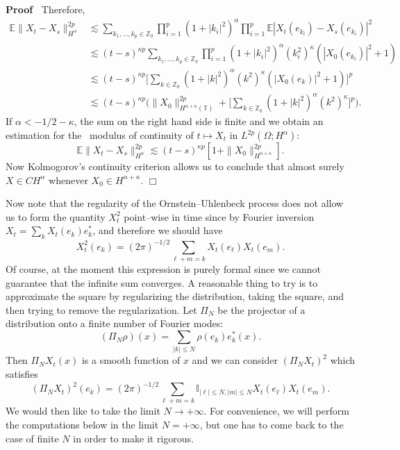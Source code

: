 \documentclass[a4paper,11pt]{article}
\newenvironment{proof}{\noindent\textbf{Proof\ }}{\hspace*{\fill}$\Box$\medskip}
\begin{document}
\begin{proof}
  Therefore,
  \begin{align*}
     \mathbb{E} \| X_t - X_s \|_{H^{\alpha}}^{2 p} & \lesssim \sum_{k_1, \ldots, k_p \in \mathbb{Z}_0} \prod_{i = 1}^p (1 + | k_i |^2)^{\alpha} \prod_{i = 1}^p \mathbb{E} | X_t (e_{k_i}) - X_s (e_{k_i}) |^2 \\
     & \lesssim (t - s)^{\kappa p} \sum_{k_1, \ldots, k_p \in \mathbb{Z}_0}  \prod_{i = 1}^p (1 + | k_i |^2)^{\alpha} (k_i^2)^{\kappa} (| X_0 (e_{k_i}) |^2 + 1) \\
     & \lesssim (t - s)^{\kappa p} \Big[ \sum_{k \in \mathbb{Z}_0} (1 + | k
     |^2)^{\alpha} (k^2)^{\kappa} (| X_0 (e_k) |^2 + 1) \Big]^p \\
     & \lesssim (t - s)^{\kappa p} \Big(\| X_0 \|^{2 p}_{H^{\alpha + \kappa} (\mathbb{T})} + \Big[\sum_{k \in \mathbb{Z}_0} (1 + | k |^2)^{\alpha} (k^2)^{\kappa}\Big]^p\Big) .
  \end{align*}
  If $\alpha < - 1 / 2 - \kappa$, the sum on the right hand side is finite and
  we obtain an estimation for the \ modulus of continuity of $t \mapsto X_t$
  in $L^{2 p} (\Omega ; H^{\alpha})$:
  \[ \mathbb{E} \| X_t - X_s \|_{H^{\alpha}}^{2 p} \lesssim (t - s)^{\kappa
     p} [1 + \| X_0 \|^{2 p}_{H^{\alpha + \kappa}}] . \]
  Now Kolmogorov's continuity criterion allows us to conclude that almost
  surely $X \in C H^{\alpha}$ whenever $X_0 \in H^{\alpha + \kappa}$.
\end{proof}

Now note that the regularity of the Ornstein--Uhlenbeck process does not allow
us to form the quantity $X^2_t$ point--wise in time since by Fourier inversion
$X_t = \sum_k X_t (e_k) e_k^{\ast}$, and therefore we should have
\[ X_t^2 (e_k) = (2 \pi)^{- 1 / 2} \sum_{\ell + m = k} X_t (e_{\ell}) X_t
   (e_m) . \]
Of course, at the moment this expression is purely formal since we cannot
guarantee that the infinite sum converges. A reasonable thing to try is to
approximate the square by regularizing the distribution, taking the square,
and then trying to remove the regularization. Let $\Pi_N$ be the projector of
a distribution onto a finite number of Fourier modes:
\[ (\Pi_N \rho) (x) = \sum_{| k | \leqslant N} \rho (e_k) e^{\ast}_k (x) . \]
Then $\Pi_N X_t (x)$ is a smooth function of $x$ and we can consider $(\Pi_N
X_t)^2$ which satisfies
\[ (\Pi_N X_t)^2 (e_k) = (2 \pi)^{- 1 / 2} \sum_{\ell + m = k} \mathbb{I}_{|
   \ell | \leqslant N, | m | \leqslant N} X_t (e_{\ell}) X_t (e_m) . \]
We would then like to take the limit $N \rightarrow + \infty$. For
convenience, we will perform the computations below in the limit $N = +
\infty$, but one has to come back to the case of finite $N$ in order to make
it rigorous.
\end{document}
